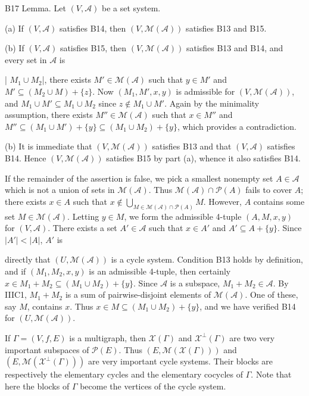 B17 Lemma. Let $(V, \mathcal{A})$ be a set system.

(a) If $(V, \mathcal{A})$ satisfies B14, then $(V, \mathcal{M}(\mathcal{A}))$ satisfies B13 and B15.

(b) If $(V, \mathcal{A})$ satisfies B15, then $(V, \mathcal{M}(\mathcal{A}))$ satisfies B13 and B14, and every set in $\mathcal{A}$ is

| $M_1 \cup M_2$|, there exists $M' \in \mathcal{M}(\mathcal{A})$ such that $y \in M'$ and $M' \subseteq (M_2 \cup M) + \{z\}$. Now $(M_1, M', x, y)$ is admissible for $(V, \mathcal{M}(\mathcal{A}))$, and $M_1 \cup M' \subseteq M_1 \cup M_2$ since $z \notin M_1 \cup M'$. Again by the minimality assumption, there exists $M'' \in \mathcal{M}(\mathcal{A})$ such that $x \in M''$ and $M'' \subseteq (M_1 \cup M') + \{y\} \subseteq (M_1 \cup M_2) + \{y\}$, which provides a contradiction.

(b) It is immediate that $(V, \mathcal{M}(\mathcal{A}))$ satisfies B13 and that $(V, \mathcal{A})$ satisfies B14. Hence $(V, \mathcal{M}(\mathcal{A}))$ satisfies B15 by part (a), whence it also satisfies B14.

If the remainder of the assertion is false, we pick a smallest nonempty set $A \in \mathcal{A}$ which is not a union of sets in $\mathcal{M}(\mathcal{A})$. Thus $\mathcal{M}(\mathcal{A}) \cap \mathcal{P}(A)$ fails to cover $A$; there exists $x \in A$ such that $x \notin \bigcup_{M \in \mathcal{M}(\mathcal{A}) \cap \mathcal{P}(A)} M$. However, $A$ contains some set $M \in \mathcal{M}(\mathcal{A})$. Letting $y \in M$, we form the admissible 4-tuple $(A, M, x, y)$ for $(V, \mathcal{A})$. There exists a set $A' \in \mathcal{A}$ such that $x \in A'$ and $A' \subseteq A + \{y\}$. Since $|A'| < |A|$, $A'$ is

directly that $(U, \mathcal{M}(\mathcal{A}))$ is a cycle system. Condition B13 holds by definition, and if $(M_1, M_2, x, y)$ is an admissible 4-tuple, then certainly $x \in M_1 + M_2 \subseteq (M_1 \cup M_2) + \{y\}$. Since $\mathcal{A}$ is a subspace, $M_1 + M_2 \in \mathcal{A}$. By IIIC1, $M_1 + M_2$ is a sum of pairwise-disjoint elements of $\mathcal{M}(\mathcal{A})$. One of these, say $M$, contains $x$. Thus $x \in M \subseteq (M_1 \cup M_2) + \{y\}$, and we have verified B14 for $(U, \mathcal{M}(\mathcal{A}))$.

If $\Gamma = (V, f, E)$ is a multigraph, then $\mathcal{X}(\Gamma)$ and $\mathcal{X}^\perp(\Gamma)$ are two very important subspaces of $\mathcal{P}(E)$. Thus $(E, \mathcal{M}(\mathcal{X}(\Gamma)))$ and $(E, \mathcal{M}(\mathcal{X}^\perp(\Gamma)))$ are very important cycle systems. Their blocks are respectively the elementary cycles and the elementary cocycles of $\Gamma$. Note that here the blocks of $\Gamma$ become the vertices of the cycle system.
